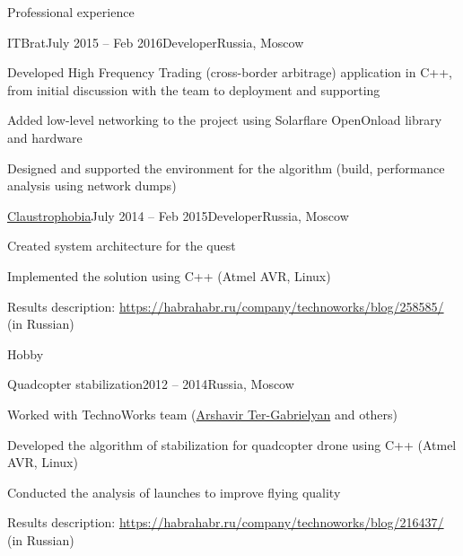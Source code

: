 \documentclass{resume} %
\begin{document}
\begin{rSection}{Professional experience}
\begin{rSubsection}{ITBrat}{July 2015 -- Feb 2016}{Developer}{Russia, Moscow}
	\item Developed High Frequency Trading (cross-border arbitrage) application in C++, from initial discussion with the team to deployment and supporting
	\item Added low-level networking to the project using Solarflare OpenOnload library and hardware
	\item Designed and supported the environment for the algorithm (build, performance analysis using network dumps)
\end{rSubsection}
	
\begin{rSubsection}{\href{http://phobia.ru}{Claustrophobia}}{July 2014 -- Feb 2015}{Developer}{Russia, Moscow}
	\item Created system architecture for the quest
	\item Implemented the solution using C++ (Atmel AVR, Linux)
	\item Results description: \url{https://habrahabr.ru/company/technoworks/blog/258585/} (in Russian)
\end{rSubsection}
	
	
\end{rSection}

\begin{rSection}{Hobby}
\begin{rSubsection}{Quadcopter stabilization}{2012 -- 2014}{}{Russia, Moscow}
\item Worked with TechnoWorks team (\href{http://www.pm.inf.ethz.ch/people/person-detail.html?persid=220074}{Arshavir Ter-Gabrielyan} and others)
\item Developed the algorithm of stabilization for quadcopter drone using C++ (Atmel AVR, Linux)
\item Conducted the analysis of launches to improve flying quality
\item Results description: \url{https://habrahabr.ru/company/technoworks/blog/216437/} (in Russian)
\end{rSubsection}

\end{rSection}

\end{document}
